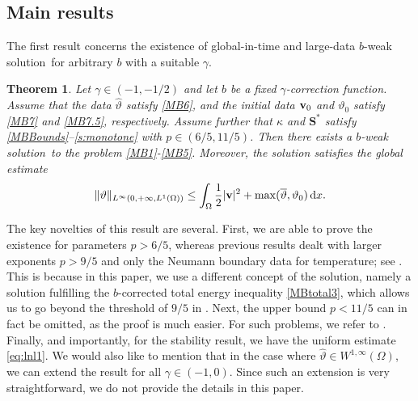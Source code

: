 \documentclass[11pt, a4paper, reqno]{amsart}
\newtheorem{theorem}{Theorem}[section]
\numberwithin{equation}{section}
\newcommand{\thetah}{\hat\thet}
\newcommand{\vc}[1]{{\bf #1}}
\newcommand{\vv}{\vc{v}}
\newcommand{\thet}{\vartheta}
\renewcommand{\S}{\mathbf{S}}
\newcommand{\dx}{\,{\rm d} {x}}
\newcommand{\intO}[1]{\int_{\Omega} #1 \dx}
\newcommand{\nm}[1]{\|#1\|}
\newcommand{\tmax}{\overline{\thet}}
\newcommand{\bb}{b}
\newcommand{\blafnc}{correction function}
\newcommand{\bws}{$\bb$-weak solution}
\begin{document}
\subsection{Main results}
The first result concerns the existence of global-in-time and large-data \bws\ for arbitrary $\bb$ with a suitable $\gamma$.
\begin{theorem}\label{thm:ex}
Let $\gamma\in(-1,-1/2)$ and let $\bb$ be a fixed $\gamma$-\blafnc. Assume that the data $\thetah$ satisfy \eqref{MB6}, and the initial data $\vv_0$ and $\thet_0$ satisfy \eqref{MB7} and \eqref{MB7.5}, respectively. Assume further that $\kappa$ and $\S^*$ satisfy \eqref{MBBounds}--\eqref{s:monotone} with $p\in(6/5,11/5)$.
Then there exists a \bws\ to the problem \eqref{MB1}-\eqref{MB5}. Moreover, the solution satisfies the global estimate
\begin{equation}\label{eq:lnl1}
\nm{\thet}_{L^\infty(0,+\infty,L^1(\Omega))}\leq \intO{\frac12|\vv|^2+\max(\tmax,\thet_0)}.
\end{equation}
\end{theorem}
The key novelties of this result are several. First, we are able to prove the existence for parameters $p>6/5$, whereas previous results dealt with larger exponents $p>9/5$ and only the Neumann boundary data for temperature; see \cite{BuMaRa09}. This is because in this paper, we use a different concept of the solution, namely a solution fulfilling the $b$-corrected total energy inequality \eqref{MBtotal3}, which allows us to go beyond the threshold of $9/5$ in \cite{BuMaRa09}. Next, the upper bound $p<11/5$ can in fact be omitted, as the proof is much easier. For such problems, we refer to \cite{ABK22}. Finally, and importantly, for the stability result, we have the uniform estimate \eqref{eq:lnl1}. We would also like to mention that in the case where $\hat{\thet}\in W^{1,\infty}(\Omega)$, we can extend the result for all $\gamma\in (-1,0)$. Since such an extension is very straightforward, we do not provide the details in this paper.

\bigskip
\end{document}
